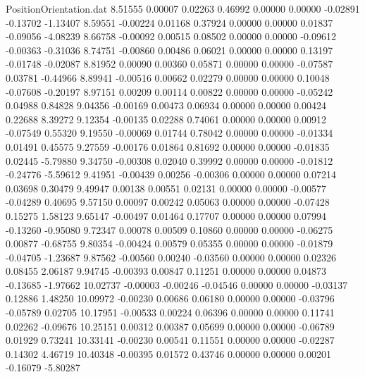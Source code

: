 \begin{filecontents}{PositionOrientation.dat}
   8.51555    0.00007    0.02263     0.46992    0.00000    0.00000   -0.02891   -0.13702   -1.13407
   8.59551   -0.00224    0.01168     0.37924    0.00000    0.00000    0.01837   -0.09056   -4.08239
   8.66758   -0.00092    0.00515     0.08502    0.00000    0.00000   -0.09612   -0.00363   -0.31036
   8.74751   -0.00860    0.00486     0.06021    0.00000    0.00000    0.13197   -0.01748   -0.02087
   8.81952    0.00090    0.00360     0.05871    0.00000    0.00000   -0.07587    0.03781   -0.44966
   8.89941   -0.00516    0.00662     0.02279    0.00000    0.00000    0.10048   -0.07608   -0.20197
   8.97151    0.00209    0.00114     0.00822    0.00000    0.00000   -0.05242    0.04988    0.84828
   9.04356   -0.00169    0.00473     0.06934    0.00000    0.00000    0.00424    0.22688    8.39272
   9.12354   -0.00135    0.02288     0.74061    0.00000    0.00000    0.00912   -0.07549    0.55320
   9.19550   -0.00069    0.01744     0.78042    0.00000    0.00000   -0.01334    0.01491    0.45575
   9.27559   -0.00176    0.01864     0.81692    0.00000    0.00000   -0.01835    0.02445   -5.79880
   9.34750   -0.00308    0.02040     0.39992    0.00000    0.00000   -0.01812   -0.24776   -5.59612
   9.41951   -0.00439    0.00256    -0.00306    0.00000    0.00000    0.07214    0.03698    0.30479
   9.49947    0.00138    0.00551     0.02131    0.00000    0.00000   -0.00577   -0.04289    0.40695
   9.57150    0.00097    0.00242     0.05063    0.00000    0.00000   -0.07428    0.15275    1.58123
   9.65147   -0.00497    0.01464     0.17707    0.00000    0.00000    0.07994   -0.13260   -0.95080
   9.72347    0.00078    0.00509     0.10860    0.00000    0.00000   -0.06275    0.00877   -0.68755
   9.80354   -0.00424    0.00579     0.05355    0.00000    0.00000   -0.01879   -0.04705   -1.23687
   9.87562   -0.00560    0.00240    -0.03560    0.00000    0.00000    0.02326    0.08455    2.06187
   9.94745   -0.00393    0.00847     0.11251    0.00000    0.00000    0.04873   -0.13685   -1.97662
  10.02737   -0.00003   -0.00246    -0.04546    0.00000    0.00000   -0.03137    0.12886    1.48250
  10.09972   -0.00230    0.00686     0.06180    0.00000    0.00000   -0.03796   -0.05789    0.02705
  10.17951   -0.00533    0.00224     0.06396    0.00000    0.00000    0.11741    0.02262   -0.09676
  10.25151    0.00312    0.00387     0.05699    0.00000    0.00000   -0.06789    0.01929    0.73241
  10.33141   -0.00230    0.00541     0.11551    0.00000    0.00000   -0.02287    0.14302    4.46719
  10.40348   -0.00395    0.01572     0.43746    0.00000    0.00000    0.00201   -0.16079   -5.80287

\end{filecontents}
